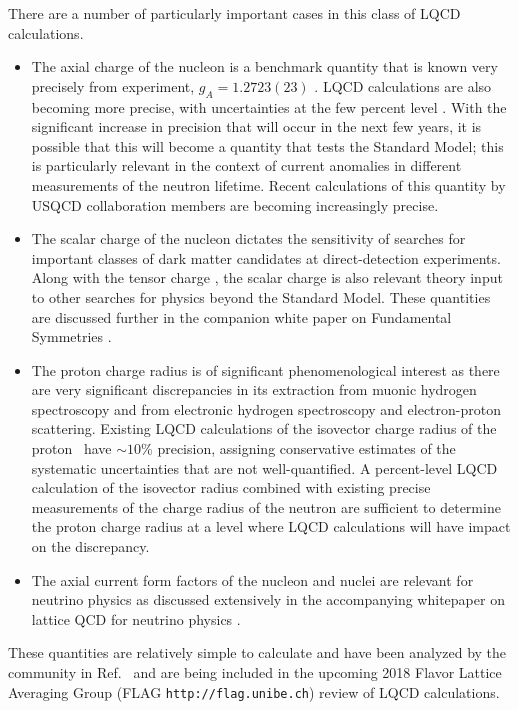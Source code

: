 There are a number of particularly important cases in this class of LQCD calculations. 
\begin{itemize}
	\item The axial charge of the nucleon is a benchmark quantity that is known very precisely from experiment, $g_A=1.2723(23)$ \cite{Patrignani:2016xqp}. LQCD calculations are also becoming more precise, with uncertainties at the few percent level  \cite{Bhattacharya:2016zcn,Yoon:2016jzj,Chang:2018uxx,Gupta:2018qil}. With the significant increase in precision that will occur in the next few years, it is possible that this will  become a quantity that tests the Standard Model; this is particularly relevant in the context of current anomalies in different measurements of the neutron lifetime. Recent calculations of this quantity by USQCD collaboration members are becoming increasingly precise.
	
	\item The scalar charge of the nucleon dictates the sensitivity of searches for important classes of dark matter candidates at direct-detection experiments. Along with the tensor charge \cite{Gupta:2018lvp}, the scalar charge \cite{Shanahan:2016pla}  is also relevant theory input to other searches for physics beyond the Standard Model. These quantities are discussed further in the companion white paper on Fundamental Symmetries \cite{wpfund}.
	
	\item The proton charge radius is  of significant phenomenological interest as there are very significant discrepancies in its extraction from muonic hydrogen spectroscopy  and from electronic hydrogen spectroscopy and electron-proton scattering. Existing LQCD calculations of the isovector charge radius of the
proton~\cite{Capitani:2015sba,Hasan:2017wwt,Alexandrou:2017ypw,Ishikawa:2018rew,Detmold:2018ptb,Alexandrou:2018sjm}  have $\sim10$\% precision, assigning conservative estimates of the systematic uncertainties that are not well-quantified. A  percent-level  LQCD calculation of the isovector radius combined with existing precise measurements of the charge radius of the neutron are sufficient to determine the proton charge radius at a level where LQCD calculations will  have impact on the discrepancy. 
	
	\item The axial current form factors of the nucleon and nuclei are relevant for neutrino physics as discussed extensively in the  accompanying whitepaper on lattice QCD for neutrino physics \cite{wpneutrino}.
\end{itemize} 
These quantities are relatively simple to calculate  and have been analyzed by the community in Ref.~\cite{Lin:2017snn} and  are being included in the upcoming 2018 Flavor Lattice Averaging Group (FLAG {\tt http://flag.unibe.ch})
review of LQCD calculations.

